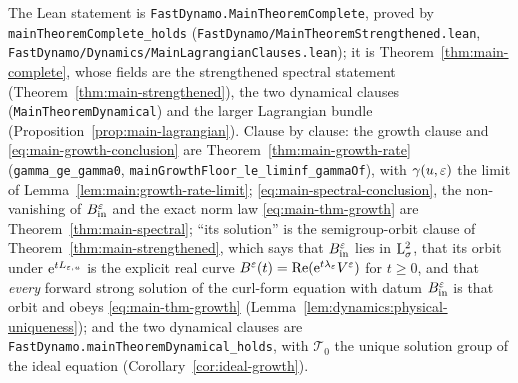 The Lean statement is \texttt{FastDynamo.MainTheoremComplete}, proved by
\texttt{mainTheoremComplete\_holds} (\texttt{FastDynamo/MainTheoremStrengthened.lean},
\texttt{FastDynamo/Dynamics/MainLagrangianClauses.lean}); it is
Theorem~\ref{thm:main-complete}, whose fields are the strengthened spectral statement
(Theorem~\ref{thm:main-strengthened}), the two dynamical clauses
(\texttt{MainTheoremDynamical}) and the larger Lagrangian bundle
(Proposition~\ref{prop:main-lagrangian}).  Clause by clause: the growth clause and
\eqref{eq:main-growth-conclusion} are Theorem~\ref{thm:main-growth-rate}
(\texttt{gamma\_ge\_gamma0}, \texttt{mainGrowthFloor\_le\_liminf\_gammaOf}), with
$\gamma(u,\varepsilon)$ the limit of Lemma~\ref{lem:main:growth-rate-limit};
\eqref{eq:main-spectral-conclusion}, the non-vanishing of $B_{\rm in}^\varepsilon$ and the exact norm
law \eqref{eq:main-thm-growth} are Theorem~\ref{thm:main-spectral}; ``its solution'' is the
semigroup-orbit clause of Theorem~\ref{thm:main-strengthened}, which says that $B_{\rm in}^\varepsilon$
lies in $\mathrm{L}^2_\sigma$, that its orbit under $\mathrm{e}^{tL_{\varepsilon,u}}$ is the explicit real curve
$B^\varepsilon(t)=\operatorname{Re}(\mathrm{e}^{t\lambda_\varepsilon}V^\varepsilon)$ for $t\geq0$, and that \emph{every} forward strong
solution of the curl-form equation with datum $B_{\rm in}^\varepsilon$ is that orbit and obeys
\eqref{eq:main-thm-growth} (Lemma~\ref{lem:dynamics:physical-uniqueness}); and the two
dynamical clauses are \texttt{FastDynamo.mainTheoremDynamical\_holds}, with $\mathcal T_0$ the
unique solution group of the ideal equation (Corollary~\ref{cor:ideal-growth}).

